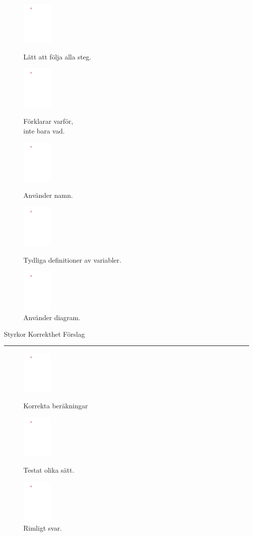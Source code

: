 \begin{questions}
\begin{figure}[H]
    \centering
    \caption*{}
    \includegraphics[width=1.5cm, page=3]{img/Bilder.pdf}
    \caption*{Lätt att följa alla steg.}
    \smallskip
    \includegraphics[width=1.5cm, page=2]{img/Bilder.pdf}
    \caption*{Förklarar varför,\\ inte bara vad.}
    \includegraphics[width=1.5cm, page=1]{img/Bilder.pdf}
    \caption*{Använder namn.}
    \includegraphics[width=1.5cm, page=5]{img/Bilder.pdf}
    \caption*{Tydliga definitioner av variabler.}
    \includegraphics[width=1.5cm, page=6]{img/Bilder.pdf}
    \caption*{Använder diagram.}
\end{figure}

\noindent Styrkor \hfill Korrekthet \hfill Förslag \hrule
\begin{figure}[H]
  \centering
  \caption*{}
  \includegraphics[width=1.5cm, page=8]{img/Bilder.pdf}
  \caption*{Korrekta beräkningar}
  \includegraphics[width=1.5cm, page=9]{img/Bilder.pdf}
  \caption*{Testat olika sätt.}
  \includegraphics[width=1.5cm, page=10]{img/Bilder.pdf}
  \caption*{Rimligt svar.}


\end{figure}
\end{questions}
